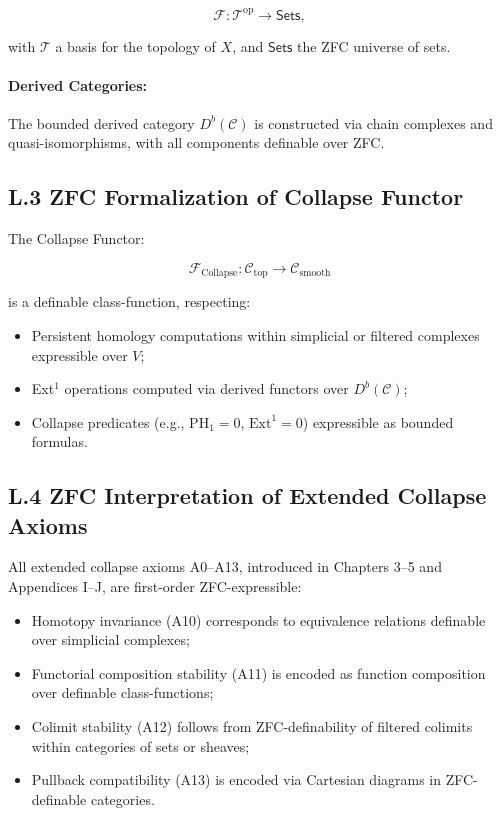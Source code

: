 \documentclass[11pt]{article}
\begin{document}
\[
\mathcal{F} : \mathcal{T}^{\mathrm{op}} \to \mathsf{Sets},
\]

with \( \mathcal{T} \) a basis for the topology of \( X \), and \( \mathsf{Sets} \) the ZFC universe of sets.

\paragraph{Derived Categories:}  
The bounded derived category \( D^b(\mathcal{C}) \) is constructed via chain complexes and quasi-isomorphisms, with all components definable over ZFC.

\subsection*{L.3 ZFC Formalization of Collapse Functor}

The Collapse Functor:

\[
\mathcal{F}_{\mathrm{Collapse}} : \mathcal{C}_{\mathrm{top}} \to \mathcal{C}_{\mathrm{smooth}}
\]

is a definable class-function, respecting:

\begin{itemize}
    \item Persistent homology computations within simplicial or filtered complexes expressible over \( V \);
    \item Ext$^1$ operations computed via derived functors over \( D^b(\mathcal{C}) \);
    \item Collapse predicates (e.g., \( \mathrm{PH}_1 = 0 \), \( \mathrm{Ext}^1 = 0 \)) expressible as bounded formulas.
\end{itemize}

\subsection*{L.4 ZFC Interpretation of Extended Collapse Axioms}

All extended collapse axioms A0–A13, introduced in Chapters 3–5 and Appendices I–J, are first-order ZFC-expressible:

\begin{itemize}
    \item Homotopy invariance (A10) corresponds to equivalence relations definable over simplicial complexes;
    \item Functorial composition stability (A11) is encoded as function composition over definable class-functions;
    \item Colimit stability (A12) follows from ZFC-definability of filtered colimits within categories of sets or sheaves;
    \item Pullback compatibility (A13) is encoded via Cartesian diagrams in ZFC-definable categories.
\end{itemize}
\end{document}
